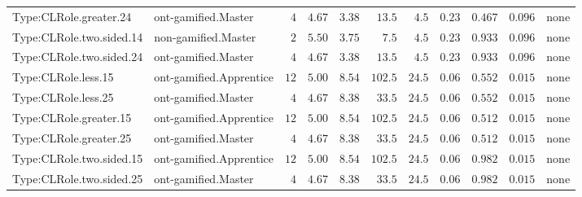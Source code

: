 \documentclass[6pt,a4paper]{article}
\begin{document}
{\begin{longtable}{llrrrrrrrrl}
Type:CLRole.greater.24&ont-gamified.Master&$ 4$&$4.67$&$ 3.38$&$ 13.5$&$  4.5$&$ 0.23$&$0.467$&$0.096$&none\tabularnewline
Type:CLRole.two.sided.14&non-gamified.Master&$ 2$&$5.50$&$ 3.75$&$  7.5$&$  4.5$&$ 0.23$&$0.933$&$0.096$&none\tabularnewline
Type:CLRole.two.sided.24&ont-gamified.Master&$ 4$&$4.67$&$ 3.38$&$ 13.5$&$  4.5$&$ 0.23$&$0.933$&$0.096$&none\tabularnewline
Type:CLRole.less.15&ont-gamified.Apprentice&$12$&$5.00$&$ 8.54$&$102.5$&$ 24.5$&$ 0.06$&$0.552$&$0.015$&none\tabularnewline
Type:CLRole.less.25&ont-gamified.Master&$ 4$&$4.67$&$ 8.38$&$ 33.5$&$ 24.5$&$ 0.06$&$0.552$&$0.015$&none\tabularnewline
Type:CLRole.greater.15&ont-gamified.Apprentice&$12$&$5.00$&$ 8.54$&$102.5$&$ 24.5$&$ 0.06$&$0.512$&$0.015$&none\tabularnewline
Type:CLRole.greater.25&ont-gamified.Master&$ 4$&$4.67$&$ 8.38$&$ 33.5$&$ 24.5$&$ 0.06$&$0.512$&$0.015$&none\tabularnewline
\newpage
Type:CLRole.two.sided.15&ont-gamified.Apprentice&$12$&$5.00$&$ 8.54$&$102.5$&$ 24.5$&$ 0.06$&$0.982$&$0.015$&none\tabularnewline
Type:CLRole.two.sided.25&ont-gamified.Master&$ 4$&$4.67$&$ 8.38$&$ 33.5$&$ 24.5$&$ 0.06$&$0.982$&$0.015$&none\tabularnewline
\hline
\end{longtable}}
\end{document}
